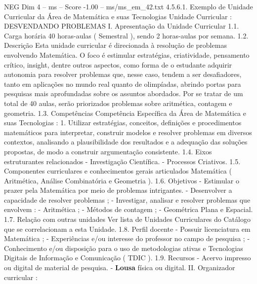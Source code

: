 \begin{textsample}{NEG Dim 4 – ms – Score -1.00 – ms/ms\_em\_42.txt}  \label{ex:f4_neg_136}
4.5.6.1.
Exemplo de Unidade Curricular da Área de Matemática e suas Tecnologias Unidade Curricular : DESVENDANDO PROBLEMAS I.
Apresentação da Unidade Curricular 1.1.
Carga horária 40 horas-aulas ( Semestral ), sendo 2 horas-aulas por semana. 1.2.
Descrição Esta unidade curricular é direcionada à resolução de problemas envolvendo Matemática.
O foco é estimular estratégias, criatividade, pensamento crítico, insight, dentre outros aspectos, como forma de o estudante adquirir autonomia para resolver problemas que, nesse caso, tendem a ser desafiadores, tanto em aplicações no mundo real quanto de olimpíadas, abrindo portas para pesquisas mais aprofundadas sobre os assuntos abordados.
Por se tratar de um total de 40 aulas, serão priorizados problemas sobre aritmética, contagem e geometria. 1.3.
Competências Competência Específica da Área de Matemática e suas Tecnologias : 1.
Utilizar estratégias, conceitos, definições e procedimentos matemáticos para interpretar, construir modelos e resolver problemas em diversos contextos, analisando a plausibilidade dos resultados e a adequação das soluções propostas, de modo a construir argumentação consistente. 1.4.
Eixos estruturantes relacionados - Investigação Científica. - Processos Criativos. 1.5.
Componentes curriculares e conhecimentos gerais articulados Matemática ( Aritmética, Análise Combinatória e Geometria ). 1.6.
Objetivos - Estimular o prazer pela Matemática por meio de problemas intrigantes. - Desenvolver a capacidade de resolver problemas ; - Investigar, analisar e resolver problemas que envolvem : - Aritmética ; - Métodos de contagem ; - Geométrica Plana e Espacial. 1.7.
Relação com outras unidades Ver lista de Unidades Curriculares do Catálogo que se correlacionam a esta Unidade. 1.8.
Perfil docente - Possuir licenciatura em Matemática ; - Experiências e/ou interesse do professor no campo de pesquisa ; - Conhecimento e/ou disposição para o uso de metodologias ativas e Tecnologias Digitais de Informação e Comunicação ( TDIC ). 1.9.
Recursos - Acervo impresso ou digital de material de pesquisa. - \textbf{Lousa} física ou digital.
II.
Organizador curricular :

\end{textsample}
